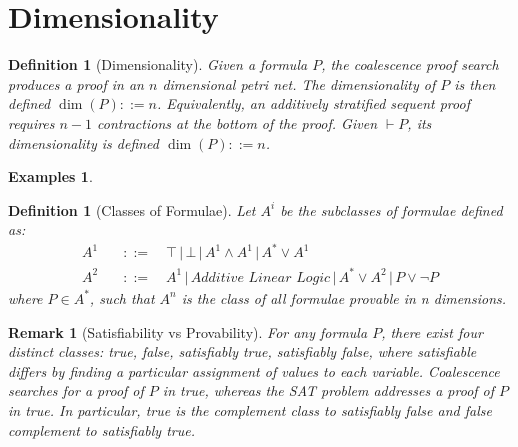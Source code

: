 \documentclass{article}
\def\defeq{::=}
\theoremstyle{indented}
\newtheorem{definition}[sec-ctr]{Definition}
\newtheorem*{examples}{Examples}
\newtheorem*{remark*}{Remark}
\begin{document}


    \section{Dimensionality}
        
        \begin{definition}[Dimensionality]
            Given a formula $P$, the coalescence proof search produces a proof in an $n$ dimensional petri net.
            The dimensionality of $P$ is then defined $\dim(P) \defeq n$.
            Equivalently, an additively stratified sequent proof requires $n - 1$ contractions at the bottom of the proof.
            Given $\vdash P$, its dimensionality is defined $\dim(P) \defeq n$.
        \end{definition}

        \begin{examples}
        \end{examples}


        \begin{definition}[Classes of Formulae]
            Let $A^i$ be the subclasses of formulae defined as:
            \begin{align*}
                A^1 \quad &\defeq \quad \top \,|\, \bot \,|\, A^1 \wedge A^1 \,|\, A^* \vee A^1 \\
                A^2 \quad &\defeq \quad A^1 \,|\, \textit{Additive Linear Logic} \,|\, A^* \vee A^2 \,|\, P \vee \neg P
            \end{align*}
            where $P \in A^*$, such that $A^n$ is the class of all formulae provable in n dimensions.
        \end{definition}


        \begin{remark*}[Satisfiability vs Provability]
            For any formula $P$, there exist four distinct classes: \textit{true, false, satisfiably true, satisfiably false}, where satisfiable differs by finding a particular assignment of values to each variable.
            Coalescence searches for a proof of $P$ in \textit{true}, whereas the SAT problem addresses a proof of $P$ in \textit{true}.
            In particular, \textit{true} is the complement class to \textit{satisfiably false} and \textit{false} complement to \textit{satisfiably true}. %
        \end{remark*}
        
\end{document}

